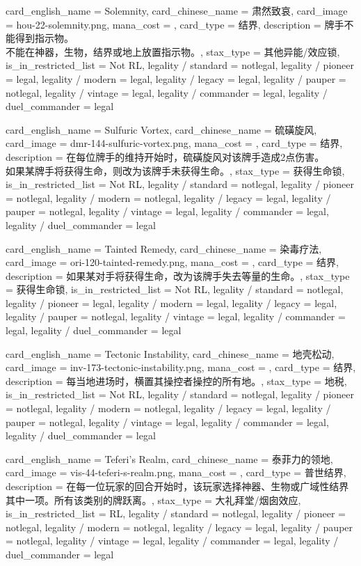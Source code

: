 \documentclass[lang = cn, color = black, 10pt]{AllThatStax}
\begin{document}
\card
{
	card_english_name = {Solemnity},
	card_chinese_name = {肃然致哀},
	card_image = hou-22-solemnity.png,
	mana_cost = ,
	card_type = 结界,
	description = {牌手不能得到指示物。\\
不能在神器，生物，结界或地上放置指示物。},
	stax_type = 其他异能/效应锁,
	is_in_restricted_list = Not RL,
	legality / standard = notlegal,
	legality / pioneer = legal,
	legality / modern = legal,
	legality / legacy = legal,
	legality / pauper = notlegal,
	legality / vintage = legal,
	legality / commander = legal,
	legality / duel_commander = legal
}

\card
{
	card_english_name = {Sulfuric Vortex},
	card_chinese_name = {硫磺旋风},
	card_image = dmr-144-sulfuric-vortex.png,
	mana_cost = ,
	card_type = 结界,
	description = {在每位牌手的维持开始时，硫磺旋风对该牌手造成2点伤害。\\
如果某牌手将获得生命，则改为该牌手未获得生命。},
	stax_type = 获得生命锁,
	is_in_restricted_list = Not RL,
	legality / standard = notlegal,
	legality / pioneer = notlegal,
	legality / modern = notlegal,
	legality / legacy = legal,
	legality / pauper = notlegal,
	legality / vintage = legal,
	legality / commander = legal,
	legality / duel_commander = legal
}

\card
{
	card_english_name = {Tainted Remedy},
	card_chinese_name = {染毒疗法},
	card_image = ori-120-tainted-remedy.png,
	mana_cost = ,
	card_type = 结界,
	description = {如果某对手将获得生命，改为该牌手失去等量的生命。},
	stax_type = 获得生命锁,
	is_in_restricted_list = Not RL,
	legality / standard = notlegal,
	legality / pioneer = legal,
	legality / modern = legal,
	legality / legacy = legal,
	legality / pauper = notlegal,
	legality / vintage = legal,
	legality / commander = legal,
	legality / duel_commander = legal
}

\card
{
	card_english_name = {Tectonic Instability},
	card_chinese_name = {地壳松动},
	card_image = inv-173-tectonic-instability.png,
	mana_cost = ,
	card_type = 结界,
	description = {每当地进场时，横置其操控者操控的所有地。},
	stax_type = 地税,
	is_in_restricted_list = Not RL,
	legality / standard = notlegal,
	legality / pioneer = notlegal,
	legality / modern = notlegal,
	legality / legacy = legal,
	legality / pauper = notlegal,
	legality / vintage = legal,
	legality / commander = legal,
	legality / duel_commander = legal
}

\card
{
	card_english_name = {Teferi's Realm},
	card_chinese_name = {泰菲力的领地},
	card_image = vis-44-teferi-s-realm.png,
	mana_cost = ,
	card_type = 普世结界,
	description = {在每一位玩家的回合开始时，该玩家选择神器、生物或广域性结界其中一项。所有该类别的牌跃离。},
	stax_type = 大礼拜堂/烟囱效应,
	is_in_restricted_list = RL,
	legality / standard = notlegal,
	legality / pioneer = notlegal,
	legality / modern = notlegal,
	legality / legacy = legal,
	legality / pauper = notlegal,
	legality / vintage = legal,
	legality / commander = legal,
	legality / duel_commander = legal
}
\end{document}
